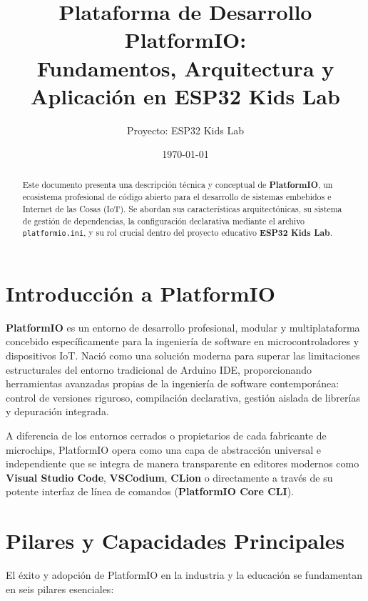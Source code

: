 \documentclass[12pt,a4paper]{article}
\title{\textbf{Plataforma de Desarrollo PlatformIO:\\ Fundamentos, Arquitectura y Aplicación en ESP32 Kids Lab}}
\author{Proyecto: ESP32 Kids Lab}
\date{\today}
\begin{document}
\maketitle

\begin{abstract}
Este documento presenta una descripción técnica y conceptual de \textbf{PlatformIO}, un ecosistema profesional de código abierto para el desarrollo de sistemas embebidos e Internet de las Cosas (IoT). Se abordan sus características arquitectónicas, su sistema de gestión de dependencias, la configuración declarativa mediante el archivo \texttt{platformio.ini}, y su rol crucial dentro del proyecto educativo \textbf{ESP32 Kids Lab}.
\end{abstract}

\vspace{0.8cm}
\tableofcontents
\newpage

\section{Introducción a PlatformIO}

\textbf{PlatformIO} es un entorno de desarrollo profesional, modular y multiplataforma concebido específicamente para la ingeniería de software en microcontroladores y dispositivos IoT. Nació como una solución moderna para superar las limitaciones estructurales del entorno tradicional de Arduino IDE, proporcionando herramientas avanzadas propias de la ingeniería de software contemporánea: control de versiones riguroso, compilación declarativa, gestión aislada de librerías y depuración integrada.

A diferencia de los entornos cerrados o propietarios de cada fabricante de microchips, PlatformIO opera como una capa de abstracción universal e independiente que se integra de manera transparente en editores modernos como \textbf{Visual Studio Code}, \textbf{VSCodium}, \textbf{CLion} o directamente a través de su potente interfaz de línea de comandos (\textbf{PlatformIO Core CLI}).

\section{Pilares y Capacidades Principales}

El éxito y adopción de PlatformIO en la industria y la educación se fundamentan en seis pilares esenciales:
\end{document}
